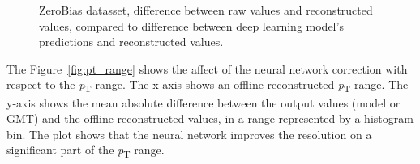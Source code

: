 \documentclass[10pt, paper=a4, UKenglish]{article}
\begin{document}
\begin{figure}[!htb]
  \centering
  \quad
  \quad
  \caption{ZeroBias datasset, difference between raw values and reconstructed values, compared to difference between deep learning model's predictions and reconstructed values.}
  \label{fig:residuals}
\end{figure}

The Figure~\ref{fig:pt_range} shows the affect of the neural network correction with respect to the \textit{p}\textsubscript{T} range. The x-axis shows an offline reconstructed \textit{p}\textsubscript{T} range. The y-axis shows the mean absolute difference between the output values (model or GMT) and the offline reconstructed values, in a range represented by a histogram bin. The plot shows that the neural network improves the resolution on a significant part of the \textit{p}\textsubscript{T} range. 

\end{document}
